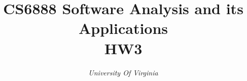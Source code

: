 \documentclass[conference]{IEEEtran}
\begin{document}
\title{CS6888 Software Analysis and its Applications \\ HW3\\
}

\author{
\textit{University Of Virginia}\\
}

\maketitle
\end{document}
